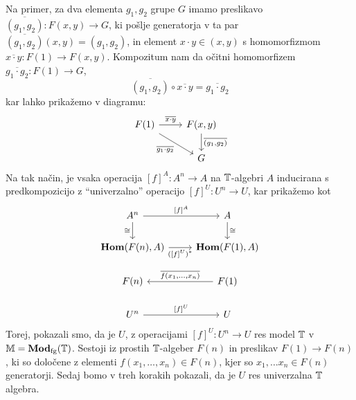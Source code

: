 \documentclass[../kategoricna_logika.tex]{subfiles}
\begin{document}
\begin{dokaz}
  Na primer, za dva elementa $g_1, g_2$ grupe $G$ imamo preslikavo
  $\overline{(g_1, g_2)} : F(x,y) \to G$, ki pošlje generatorja v ta par
  $\overline{(g_1, g_2)}(x,y) = (g_1, g_2)$, in element $x \cdot y \in (x,y)$ s homomorfizmom
  $\overline{x \cdot y}: F(1) \to F(x,y)$. Kompozitum nam da očitni homomorfizem
  $\overline{g_1 \cdot g_2} : F(1) \to G$,
  \[ \overline{(g_1, g_2)} \circ \overline{x \cdot y} = \overline{g_1 \cdot g_2}\]
  kar lahko prikažemo v diagramu:
  \begin{equation*}
    \begin{tikzcd}
      F(1) \ar[dr, "{\overline{g_1 \cdot g_2}}"'] \ar[r, "{\overline{x \cdot y}}"] &
      F(x,y) \ar[d, "\overline{(g_1,g_2)}"] \\
      & G      
    \end{tikzcd}
  \end{equation*}
  Na tak način, je vsaka operacija $[f]^A : A^n \to A$ na $\mathbb{T}$-algebri $A$ inducirana s
  predkompozicijo z ``univerzalno'' operacijo $[f]^U : U^n \to U$, kar prikažemo kot
  \begin{equation}\label{diag:univerzalna-operacija}
    \begin{tikzcd}
      A^n \ar[d, "\cong"'] \ar[r, "{[f]^{A}}"] & A \ar[d, "\cong"] \\
      \Hom(F(n), A) \ar[r, "{([f]^U)^{*}}"'] & \Hom(F(1), A) \\
      F(n) & F(1) \ar[l, "{\overline{f(x_1, \ldots, x_n)}}"'] \\
      U^n \ar[r, "{[f]^U}"] & U
    \end{tikzcd}
  \end{equation}
  Torej, pokazali smo, da je $U$, z operacijami $[f]^U : U^n \to U$ res model $\mathbb{T}$
  v $\mathbb{M} = \mathbf{Mod}_{\mathrm{fg}}(\mathbb{T})$. Sestoji iz prostih $\mathbb{T}$-algeber $F(n)$ in
  preslikav $F(1) \to F(n)$, ki so določene z elementi $f(x_1, \ldots, x_n) \in F(n)$,
  kjer so $x_1, \ldots x_n \in F(n)$ generatorji. Sedaj bomo v treh korakih pokazali,
  da je $U$ res univerzalna $\mathbb{T}$ algebra.


\end{dokaz}
\end{document}
